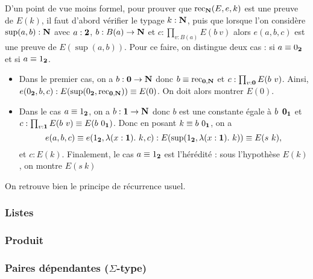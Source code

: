 \documentclass[../../rapport.tex]{subfiles}
\begin{document}
  D'un point de vue moins formel, pour prouver que $\operatorname{rec}_{\mathbf N}(E, e, k)$ est une preuve de $E(k)$,
  il faut d'abord vérifier le typage $k : \mathbf N$, puis que lorsque l'on considère $\sup(a, b) : \mathbf N$ avec
  $a : \operatorname{\textbf{2}}$, $b : B(a) \rightarrow \mathbf N$ et $c : \prod_{v : B(a)}{E(b\ v)}$ alors $e(a, b, c)$ est une preuve de $E(\sup(a, b))$.
  Pour ce faire, on distingue deux cas : si $a \equiv 0_{\operatorname{\textbf{2}}}$ et si $a \equiv 1_{\operatorname{\textbf{2}}}$.
  \begin{itemize}
    \item Dans le premier cas, on a $b : \operatorname{\textbf{0}} \rightarrow \mathbf N$ donc $b \equiv \operatorname{rec}_{\operatorname{\textbf{0}}, \mathbf N}$ et $c : \prod_{v:\0}{E(b\ v)}$.
      Ainsi, $e(0_{\operatorname{\textbf{2}}}, b, c) : E(\sup(0_{\operatorname{\textbf{2}}}, \operatorname{rec}_{\operatorname{\textbf{0}},\mathbf N})) \equiv E(0)$. On doit alors montrer $E(0)$.
    \item Dans le cas $a \equiv 1_{\operatorname{\textbf{2}}}$, on a $b : \operatorname{\textbf{1}} \rightarrow \mathbf N$ donc $b$ est une constante égale à $b\ \operatorname{\textbf{0}}_{\operatorname{\textbf{1}}}$ et
      $c : \prod_{v : \1}{E(b\ v)} \equiv E(b\ 0_{\1})$.
      Donc en posant $k \equiv b\ 0_{\1}$, on a
      $$e(a, b, c) \equiv e(1_{\operatorname{\textbf{2}}}, \lambda(x : \operatorname{\textbf{1}}).\ k, c) : E(\sup(1_{\operatorname{\textbf{2}}}, \lambda(x : \operatorname{\textbf{1}}).\ k)) \equiv E(s\ k),$$
      et $c : E(k)$.
      Finalement, le cas $a \equiv 1_{\operatorname{\textbf{2}}}$ est l'hérédité : sous l'hypothèse $E(k)$, on montre $E(s\ k)$
  \end{itemize}
  On retrouve bien le principe de récurrence usuel.

  \subsubsection{Listes}

  \subsubsection{Produit}

  \subsubsection{Paires dépendantes ($\Sigma$-type)}
\end{document}
